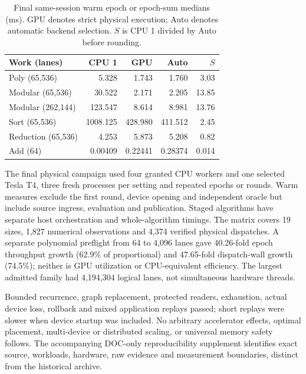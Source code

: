 \begin{table}[t]
\centering\footnotesize
\caption{Final same-session warm epoch or epoch-sum medians (ms). GPU denotes strict physical execution; Auto denotes automatic backend selection. $S$ is CPU 1 divided by Auto before rounding.}\label{tab:native-physical}
\begin{tabular}{@{}lrrrr@{}}\toprule
Work (lanes)&CPU 1&GPU&Auto&$S$\\\midrule
Poly (65,536)&5.328&1.743&1.760&3.03\\
Modular (65,536)&30.522&2.171&2.205&13.85\\
Modular (262,144)&123.547&8.614&8.981&13.76\\
Sort (65,536)&1008.125&428.980&411.512&2.45\\
Reduction (65,536)&4.253&5.873&5.208&0.82\\
Add (64)&0.00409&0.22441&0.28374&0.014\\\bottomrule
\end{tabular}
\end{table}
The final physical campaign used four granted CPU workers and one selected Tesla T4, three fresh processes per setting and repeated epochs or rounds. Warm measures exclude the first round, device opening and independent oracle but include source ingress, evaluation and publication. Staged algorithms have separate host orchestration and whole-algorithm timings. The matrix covers 19 sizes, 1,827 numerical observations and 4,374 verified physical dispatches. A separate polynomial preflight from 64 to 4,096 lanes gave 40.26-fold epoch throughput growth (62.9\% of proportional) and 47.65-fold dispatch-wall growth (74.5\%); neither is GPU utilization or CPU-equivalent efficiency. The largest admitted family had 4,194,304 logical lanes, not simultaneous hardware threads.

Bounded recurrence, graph replacement, protected readers, exhaustion, actual device loss, rollback and mixed application replays passed; short replays were slower when device startup was included. No arbitrary accelerator effects, optimal placement, multi-device or distributed scaling, or universal memory safety follows. The accompanying DOC-only reproducibility supplement identifies exact source, workloads, hardware, raw evidence and measurement boundaries, distinct from the historical archive.

